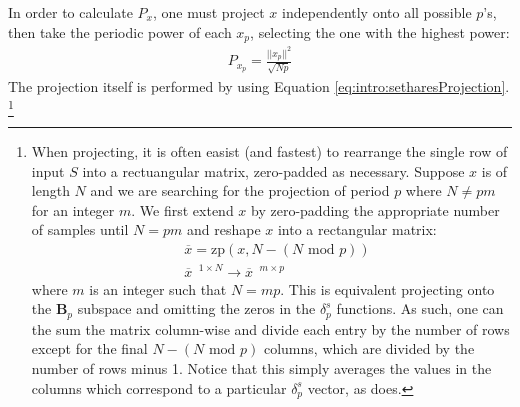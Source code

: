     In order to calculate $P_x$, one must project $x$ independently onto all possible $p$'s, then take the periodic power of each $x_p$, selecting the one with the highest power:
    \begin{align}
        P_{x_{p}} = \frac{||x_p||^2} {\sqrt{Np}}
    \end{align}
    The projection itself is performed by using Equation \eqref{eq:intro:setharesProjection}.
    \footnote{When projecting, it is often easist (and fastest) to rearrange the single row of input $S$ into a rectuangular matrix, zero-padded as necessary. Suppose $x$ is of length $N$ and we are searching for the projection of period $p$ where $N \neq pm$ for an integer $m$. We first extend $x$ by zero-padding the appropriate number of samples until $N = pm$ and reshape $x$ into a rectangular matrix:
    \begin{align}
        &\overline{x} = \text{zp}(x, N - (N \text{ mod } p)) \label{eq:detection:overlineS} \\
        &\overline{x}^{\text{ } 1 \times N} \rightarrow \overline{x}^{\text{ } m \times p} \label{eq:detection:overlineSReshaped}
    \end{align}
    where $m$ is an integer such that $N = mp$. This is equivalent projecting onto the $\bm{B}_p$ subspace and omitting the zeros in the $\delta^s_p$ functions. As such, one can the sum the matrix column-wise and divide each entry by the number of rows except for the final $N - (N \text{ mod } p)$ columns, which are divided by the number of rows minus 1. Notice that this simply averages the values in the columns which correspond to a particular $\delta^s_p$ vector, as \cite{sethares1999periodicity} does.}



